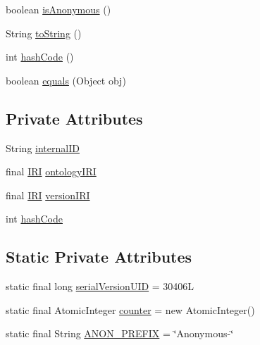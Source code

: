 \begin{DoxyCompactItemize}
\item 
boolean \hyperlink{classorg_1_1semanticweb_1_1owlapi_1_1model_1_1_o_w_l_ontology_i_d_a9b085972a09242a2d75255f988d454df}{is\-Anonymous} ()
\item 
String \hyperlink{classorg_1_1semanticweb_1_1owlapi_1_1model_1_1_o_w_l_ontology_i_d_aee85ddcc9877ca32c8b35c70b9f1b9e9}{to\-String} ()
\item 
int \hyperlink{classorg_1_1semanticweb_1_1owlapi_1_1model_1_1_o_w_l_ontology_i_d_aad3c5f494a447af8a977ad3e8965155e}{hash\-Code} ()
\item 
boolean \hyperlink{classorg_1_1semanticweb_1_1owlapi_1_1model_1_1_o_w_l_ontology_i_d_a06dc6c33c09473c25f922b83351c49f7}{equals} (Object obj)
\end{DoxyCompactItemize}
\subsection*{Private Attributes}
\begin{DoxyCompactItemize}
\item 
String \hyperlink{classorg_1_1semanticweb_1_1owlapi_1_1model_1_1_o_w_l_ontology_i_d_ae56116a0b0930b1b363f65f8ef771e25}{internal\-I\-D}
\item 
final \hyperlink{classorg_1_1semanticweb_1_1owlapi_1_1model_1_1_i_r_i}{I\-R\-I} \hyperlink{classorg_1_1semanticweb_1_1owlapi_1_1model_1_1_o_w_l_ontology_i_d_a502673ac2e520de588123531d6b8808d}{ontology\-I\-R\-I}
\item 
final \hyperlink{classorg_1_1semanticweb_1_1owlapi_1_1model_1_1_i_r_i}{I\-R\-I} \hyperlink{classorg_1_1semanticweb_1_1owlapi_1_1model_1_1_o_w_l_ontology_i_d_a1e7ae2498d335c2596f41a49a61c100a}{version\-I\-R\-I}
\item 
int \hyperlink{classorg_1_1semanticweb_1_1owlapi_1_1model_1_1_o_w_l_ontology_i_d_a2e5b0f634c34f163af7a2d07f6831fe3}{hash\-Code}
\end{DoxyCompactItemize}
\subsection*{Static Private Attributes}
\begin{DoxyCompactItemize}
\item 
static final long \hyperlink{classorg_1_1semanticweb_1_1owlapi_1_1model_1_1_o_w_l_ontology_i_d_ae2e755a3776c5977d80eeb37d5580399}{serial\-Version\-U\-I\-D} = 30406\-L
\item 
static final Atomic\-Integer \hyperlink{classorg_1_1semanticweb_1_1owlapi_1_1model_1_1_o_w_l_ontology_i_d_a00bd5134cbf9c948cba9ac4ccb2e4c48}{counter} = new Atomic\-Integer()
\item 
static final String \hyperlink{classorg_1_1semanticweb_1_1owlapi_1_1model_1_1_o_w_l_ontology_i_d_a0b389e40a46cbcde27513782af56b5dd}{A\-N\-O\-N\-\_\-\-P\-R\-E\-F\-I\-X} = \char`\"{}Anonymous-\/\char`\"{}
\end{DoxyCompactItemize}


